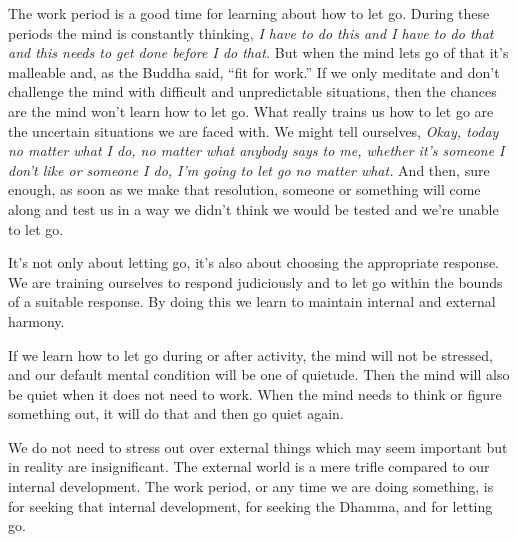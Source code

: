 
The work period is a good time for learning about how to let go. During 
these periods the mind is constantly thinking, \emph{I have to do this 
and I have to do that and this needs to get done before I do that.} But 
when the mind lets go of that it's malleable and, as the Buddha said, 
``fit for work.'' If we only meditate and don't challenge the mind with 
difficult and unpredictable situations, then the chances are the mind 
won't learn how to let go. What really trains us how to let go are the 
uncertain situations we are faced with. We might tell ourselves, 
\emph{Okay, today no matter what I do, no matter what anybody says to 
me, whether it's someone I don't like or someone I do, I'm going to let 
go no matter what.} And then, sure enough, as soon as we make that 
resolution, someone or something will come along and test us in a way 
we didn't think we would be tested and we're unable to let go.

It's not only about letting go, it's also about choosing the 
appropriate response. We are training ourselves to respond judiciously 
and to let go within the bounds of a suitable response. By doing this 
we learn to maintain internal and external harmony.

If we learn how to let go during or after activity, the mind will not 
be stressed, and our default mental condition will be one of quietude. 
Then the mind will also be quiet when it does not need to work. When 
the mind needs to think or figure something out, it will do that and 
then go quiet again.

We do not need to stress out over external things which may seem 
important but in reality are insignificant. The external world is a 
mere trifle compared to our internal development. The work period, or 
any time we are doing something, is for seeking that internal 
development, for seeking the Dhamma, and for letting go.

